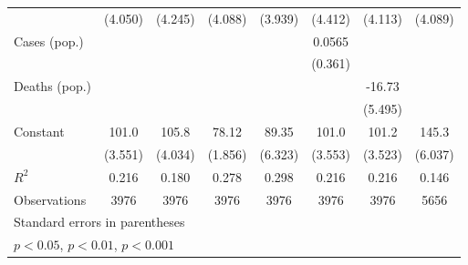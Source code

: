 \documentclass{article}
\begin{document}
{\begin{longtable}{l*{7}{c}}
                &  (4.050)         &  (4.245)         &  (4.088)         &  (3.939)         &  (4.412)         &  (4.113)         &  (4.089)         \\
Cases (pop.)    &                  &                  &                  &                  &   0.0565         &                  &                  \\
                &                  &                  &                  &                  &  (0.361)         &                  &                  \\
Deaths (pop.)   &                  &                  &                  &                  &                  &   -16.73\sym{**} &                  \\
                &                  &                  &                  &                  &                  &  (5.495)         &                  \\
Constant        &    101.0\sym{***}&    105.8\sym{***}&    78.12\sym{***}&    89.35\sym{***}&    101.0\sym{***}&    101.2\sym{***}&    145.3\sym{***}\\
                &  (3.551)         &  (4.034)         &  (1.856)         &  (6.323)         &  (3.553)         &  (3.523)         &  (6.037)         \\
\hline
\(R^{2}\)       &    0.216         &    0.180         &    0.278         &    0.298         &    0.216         &    0.216         &    0.146         \\
Observations    &     3976         &     3976         &     3976         &     3976         &     3976         &     3976         &     5656         \\
\hline\hline
\multicolumn{8}{l}{\footnotesize Standard errors in parentheses}\\
\multicolumn{8}{l}{\footnotesize \sym{*} \(p<0.05\), \sym{**} \(p<0.01\), \sym{***} \(p<0.001\)}\\
\end{longtable}
}
\end{document}
